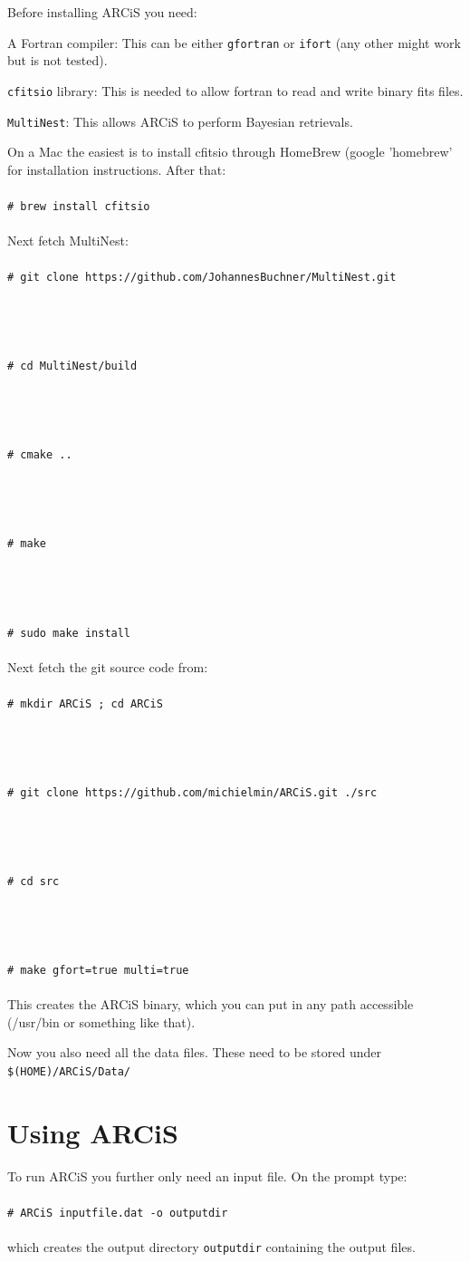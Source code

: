 \documentclass[12pt]{article}
\newcommand{\shellcmd}[1]{\\ \\ \indent\indent\texttt{\# #1}\\ \\ }
\begin{document}
Before installing ARCiS you need:
\begin{description}
\item{A Fortran compiler:} This can be either \texttt{gfortran} or \texttt{ifort} (any other might work but is not tested).
\item{\texttt{cfitsio} library:} This is needed to allow fortran to read and write binary fits files.
\item{\texttt{MultiNest}:} This allows ARCiS to perform Bayesian retrievals.
\end{description}

On a Mac the easiest is to install cfitsio through HomeBrew (google 'homebrew' for installation instructions. After that:
%
\shellcmd{brew install cfitsio}
%
Next fetch MultiNest:
%
\shellcmd{git clone https://github.com/JohannesBuchner/MultiNest.git}
\vspace{-2cm}\\
\shellcmd{cd MultiNest/build}
\vspace{-2cm}\\
\shellcmd{cmake ..}
\vspace{-2cm}\\
\shellcmd{make}
\vspace{-2cm}\\
\shellcmd{sudo make install}


Next fetch the git source code from:
%
\shellcmd{mkdir ARCiS ; cd ARCiS}
\vspace{-2cm}\\
\shellcmd{git clone https://github.com/michielmin/ARCiS.git ./src}
\vspace{-2cm}\\
\shellcmd{cd src}
\vspace{-2cm}\\
\shellcmd{make gfort=true multi=true}
%
This creates the ARCiS binary, which you can put in any path accessible (/usr/bin or something like that).

Now you also need all the data files. These need to be stored under \texttt{\$(HOME)/ARCiS/Data/}

\section{Using ARCiS}

To run ARCiS you further only need an input file. On the prompt type:
%
\shellcmd{ARCiS inputfile.dat -o outputdir}
%
which creates the output directory \texttt{outputdir} containing the output files.
\end{document}
